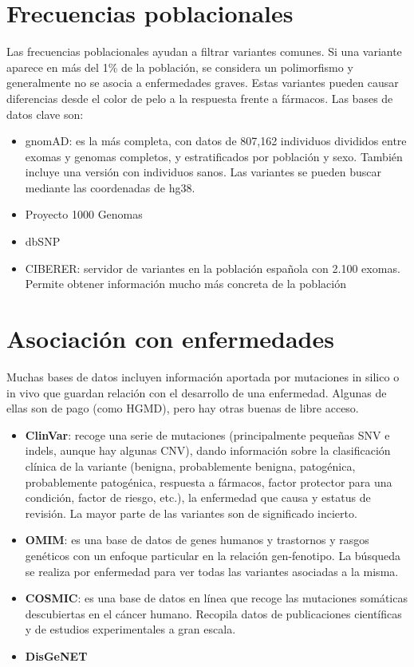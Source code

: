 \section{Frecuencias poblacionales}
Las frecuencias poblacionales ayudan a filtrar variantes comunes. Si una variante aparece en más del 1\% de la población, se considera un polimorfismo y generalmente no se asocia a enfermedades graves. Estas variantes pueden causar diferencias desde el color de pelo a la respuesta frente a fármacos. Las bases de datos clave son:
\begin{itemize}
\item gnomAD: es la más completa, con datos de 807,162 individuos divididos entre exomas y genomas completos, y estratificados por población y sexo. También incluye una versión con individuos sanos. Las variantes se pueden buscar mediante las coordenadas de hg38.
\item Proyecto 1000 Genomas
\item dbSNP
\item CIBERER: servidor de variantes en la población española con 2.100 exomas. Permite obtener información mucho más concreta de la población
\end{itemize}

\section{Asociación con enfermedades}
Muchas bases de datos incluyen información aportada por mutaciones in silico o in vivo que guardan relación con el desarrollo de una enfermedad. Algunas de ellas son de pago (como HGMD), pero hay otras buenas de libre acceso.
\begin{itemize}
\item \textbf{ClinVar}: recoge una serie de mutaciones (principalmente pequeñas SNV e indels, aunque hay algunas CNV), dando información sobre la clasificación clínica de la variante (benigna, probablemente benigna, patogénica, probablemente patogénica, respuesta a fármacos, factor protector para una condición, factor de riesgo, etc.), la enfermedad que causa y estatus de revisión. La mayor parte de las variantes son de significado incierto.
\item \textbf{OMIM}: es una base de datos de genes humanos y trastornos y rasgos genéticos con un enfoque particular en la relación gen-fenotipo. La búsqueda se realiza por enfermedad para ver todas las variantes asociadas a la misma.
\item \textbf{COSMIC}: es una base de datos en línea que recoge las mutaciones somáticas descubiertas en el cáncer humano. Recopila datos de publicaciones científicas y de estudios experimentales a gran escala.
\item \textbf{DisGeNET}
\end{itemize}

